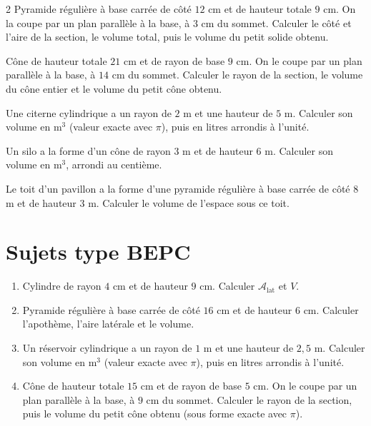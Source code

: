 \begin{multicols}{2}
\exo{} Pyramide régulière à base carrée de côté $12$ cm et de hauteur totale $9$ cm.
On la coupe par un plan parallèle à la base, à $3$ cm du sommet. Calculer le côté et l'aire
de la section, le volume total, puis le volume du petit solide obtenu.

\exo{} Cône de hauteur totale $21$ cm et de rayon de base $9$ cm. On le coupe par un
plan parallèle à la base, à $14$ cm du sommet. Calculer le rayon de la section, le volume du
cône entier et le volume du petit cône obtenu.

\exo{} Une citerne cylindrique a un rayon de $2$ m et une hauteur de $5$ m. Calculer
son volume en m$^{3}$ (valeur exacte avec $\pi$), puis en litres arrondis à l'unité.

\exo{} Un silo a la forme d'un cône de rayon $3$ m et de hauteur $6$ m. Calculer son
volume en m$^{3}$, arrondi au centième.

\exo{} Le toit d'un pavillon a la forme d'une pyramide régulière à base carrée de
côté $8$ m et de hauteur $3$ m. Calculer le volume de l'espace sous ce toit.

\end{multicols}

\section{Sujets type BEPC}

\begin{enumerate}[label=\arabic*)]
\item Cylindre de rayon $4$ cm et de hauteur $9$ cm. Calculer $\mathcal{A}_{\text{lat}}$ et $V$.
\item Pyramide régulière à base carrée de côté $16$ cm et de hauteur $6$ cm. Calculer
l'apothème, l'aire latérale et le volume.
\item Un réservoir cylindrique a un rayon de $1$ m et une hauteur de $2{,}5$ m. Calculer son
volume en m$^{3}$ (valeur exacte avec $\pi$), puis en litres arrondis à l'unité.
\item Cône de hauteur totale $15$ cm et de rayon de base $5$ cm. On le coupe par un plan
parallèle à la base, à $9$ cm du sommet. Calculer le rayon de la section, puis le volume du
petit cône obtenu (sous forme exacte avec $\pi$).
\end{enumerate}

